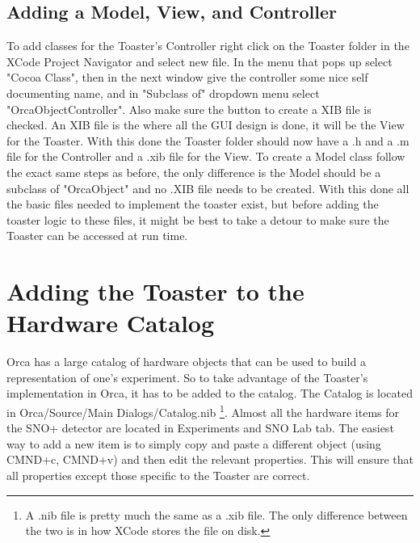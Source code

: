 \documentclass[12pt,a4paper]{article}
\begin{document}
   \subsection{Adding a Model, View, and Controller}
   To add classes for the Toaster's Controller right click on the Toaster folder in the XCode Project Navigator and select new file.
  In the menu that pops up select "Cocoa Class", then in the next window give the controller some nice  self documenting name, and in "Subclass of" dropdown menu select "OrcaObjectController". 
  Also make sure the button to create a XIB file is checked.
An XIB file is the where all the GUI design is done, it will be the View for the Toaster.
With this done the Toaster folder should now have a .h and a .m file for the Controller and a .xib file for the View.
To create a Model class follow the exact same steps as before, the only difference is the Model should be a subclass of "OrcaObject" and no .XIB file needs to be created.
With this done all the basic files needed to implement the toaster exist, but before adding the toaster logic to these files, it might be best to take a detour to make sure the Toaster can be accessed at run time.
\section{Adding the Toaster to the Hardware Catalog}
Orca has a large catalog of hardware objects that can be used to build a representation of one's experiment.
So to take advantage of the Toaster's implementation in Orca, it has to be added to the catalog.
The Catalog is located in Orca/Source/Main Dialogs/Catalog.nib
\footnote{A .nib file is pretty much the same as a .xib file. 
The only difference between the two is in how XCode stores the file on disk.}.
 Almost all the hardware items for the SNO+ detector are located in Experiments and SNO Lab tab.
 The easiest way to add a new item is to simply copy and paste  a different object 
 (using CMND+c, CMND+v) and then edit the relevant properties.
  This will ensure that all properties except those specific to the Toaster are correct.
\end{document}
